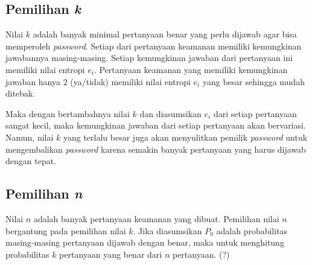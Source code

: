 \subsection{Pemilihan \textit{k}}

Nilai \begin{math}k\end{math} adalah banyak minimal pertanyaan benar yang perlu dijawab agar bisa memperoleh \textit{password}. Setiap dari pertanyaan keamanan memiliki kemungkinan jawabannya masing-masing. Setiap kemungkinan jawaban dari pertanyaan ini memiliki nilai entropi \begin{math}e_i\end{math}. Pertanyaan keamanan yang memiliki kemungkinan jawaban hanya 2 (ya/tidak) memiliki nilai entropi \begin{math}e_i\end{math} yang besar sehingga mudah ditebak.

Maka dengan bertambahnya nilai \begin{math}k\end{math} dan diasumsikan \begin{math}e_i\end{math} dari setiap pertanyaan sangat kecil, maka kemungkinan jawaban dari setiap pertanyaan akan bervariasi. Namun, nilai \begin{math}k\end{math} yang terlalu besar juga akan menyulitkan pemilik \textit{password} untuk mengembalikan \textit{password} karena semakin banyak pertanyaan yang harus dijawab dengan tepat.

\subsection{Pemilihan \textit{n}}

Nilai \begin{math}n\end{math} adalah banyak pertanyaan keamanan yang dibuat. Pemilihan nilai \begin{math}n\end{math} bergantung pada pemilihan nilai \begin{math}k\end{math}. Jika diasumsikan \begin{math}P_0\end{math} adalah probabilitas masing-masing pertanyaan dijawab dengan benar, maka untuk menghitung probabilitas \begin{math}k\end{math} pertanyaan yang benar dari \begin{math}n\end{math} pertanyaan. (?)

